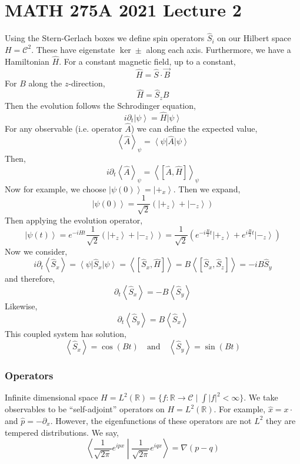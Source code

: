 \documentclass[12pt]{article}
\begin{document}
\renewcommand{\C}{\mathcal{C}}

\section{MATH 275A 2021 Lecture 2}

\newcommand{\ket}[1]{\left| #1 \right>}
\newcommand{\bra}[1]{\left< #1 \right|}

Using the Stern-Gerlach boxes we define spin operators $\hat{S}_i$ on our Hilbert space $H = \C^2$. These have eigenstate $\ker{\pm}$ along each axis. Furthermore, we have a Hamiltonian $\hat{H}$. For a constant magnetic field, up to a constant,
\[ \hat{H} = \hat{S} \cdot \vec{B} \]
For $B$ along the $z$-direction,
\[ \hat{H} = \hat{S}_z B \]
Then the evolution follows the Schrodinger equation,
\[ i \partial_t \ket{\psi} = \hat{H} \ket{\psi} \]
For any observable (i.e. operator $\hat{A}$) we can define the expected value,
\[ \left< \hat{A} \right>_\psi = \bra{\psi} \hat{A} \ket{\psi} \]
Then,
\[ i \partial_t \left< \hat{A} \right>_\psi= \left< [\hat{A}, \hat{H}] \right>_{\psi} \]
Now for example, we choose $\ket{\psi(0)} = \ket{+_x}$. Then we expand,
\[ \ket{\psi(0)} = \frac{1}{\sqrt{2}} \left( \ket{+_z} + \ket{-_z} \right) \]
Then applying the evolution operator,
\[ \ket{\psi(t)} = e^{-i H t} \frac{1}{\sqrt{2}} \left( \ket{+_z} + \ket{-_z} \right) = \frac{1}{\sqrt{2}} \left( e^{-i \frac{B}{2}t} \ket{+_z} + e^{i \frac{B}{2}t} \ket{-_z} \right) \]
Now we consider,
\[ i \partial_t \left< \hat{S}_x \right> = \bra{\psi} \hat{S}_x \ket{\psi} = \left< [\hat{S}_x, \hat{H}] \right> = B \left< [\hat{S}_x, \hat{S}_z] \right> = - i B \hat{S}_y \]
and therefore,
\[ \partial_t \left< \hat{S}_x \right> = - B \left< \hat{S}_y \right> \]
Likewise,
\[ \partial_t \left< \hat{S}_y \right> = B \left< \hat{S}_x \right> \]
This coupled system has solution,
\[ \left< \hat{S}_x \right> = \cos{(B t)} \quad \text{and} \quad \left< \hat{S}_y \right> = \sin{(B t)} \]

\subsubsection{Operators}

\newcommand{\R}{\mathbb{R}}

Infinite dimensional space $H = L^2(\R) = \{ f : \R \to \C \mid \int |f|^2 < \infty \}$. We take observables to be ``self-adjoint'' operators on $H = L^2(\R)$. For example, $\hat{x} = x \cdot$ and $\hat{p} = - \partial_x$. However, the eigenfunctions of these operators are not $L^2$ they are tempered distributions. We say,
\[ \left< \frac{1}{\sqrt{2\pi}} e^{i p x} \middle| \frac{1}{\sqrt{2\pi}} e^{i q x} \right> = \nabla(p - q) \]
\end{document}
